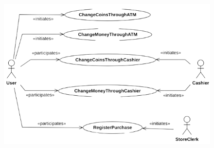 \documentclass[12pt, a4paper]{report}
\newtheorem[style=M,bodystyle=\normalfont]{theorem}{Theorem}
\newtheorem[style=M,bodystyle=\normalfont]{corollary}{Corollary}
\newtheorem[style=M,bodystyle=\normalfont]{lemma}{Lemma}
\newtheorem[style=M,bodystyle=\normalfont]{definition}{Definition}
\begin{document}
\begin{Answer}[ref=2]
\begin{enumerate}
                \begin{figure}[H]
                    \centering
                    \includegraphics[width=0.9\linewidth]{images/usecase2.png}
                \end{figure}
        \end{enumerate}
    \end{Answer}
\end{document}
